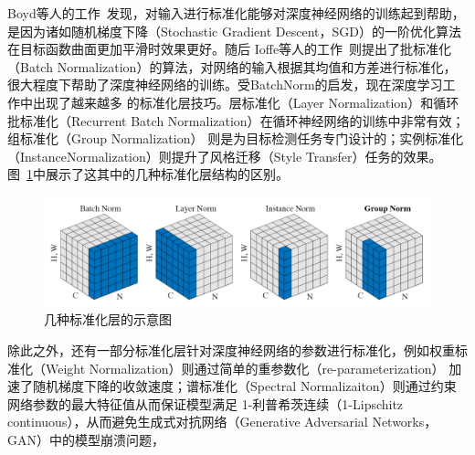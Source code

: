 Boyd等人的工作~\citep{boyd_convex_2004}发现，对输入进行标准化能够对深度神经网络的训练起到帮助，是因为诸如随机梯度下降（Stochastic Gradient Descent，SGD）的一阶优化算法在目标函数曲面更加平滑时效果更好。随后
Ioffe等人的工作~\citep{ioffe2015BN}则提出了批标准化（Batch Normalization）的算法，对网络的输入根据其均值和方差进行标准化，很大程度下帮助了深度神经网络的训练。受BatchNorm的启发，现在深度学习工作中出现了越来越多
的标准化层技巧。层标准化（Layer Normalization）\citep{lei2016LayerNorm}和循环批标准化（Recurrent Batch Normalization）\citep{cooijmans2016recurrent}在循环神经网络的训练中非常有效；组标准化（Group Normalization）
\citep{wu2018GroupNorm}则是为目标检测任务专门设计的；实例标准化（InstanceNormalization）\citep{ulyanov_instance_2016}则提升了风格迁移（Style Transfer）任务的效果。
图~\ref{fig:norm}中展示了这其中的几种标准化层结构的区别。
\begin{figure}
    \centering
    \includegraphics[width=\linewidth]{figures/norm.png}
    \caption{几种标准化层的示意图~\citep{wu2018GroupNorm}}
    \label{fig:norm}
\end{figure}

除此之外，还有一部分标准化层针对深度神经网络的参数进行标准化，例如权重标准化（Weight Normalization）\citep{Salimans2016Weight}则通过简单的重参数化（re-parameterization）
加速了随机梯度下降的收敛速度；谱标准化（Spectral Normalizaiton）\citep{miyato_spectral_2018}则通过约束网络参数的最大特征值从而保证模型满足
1-利普希茨连续（1-Lipschitz continuous），从而避免生成式对抗网络（Generative Adversarial Networks，GAN）中的模型崩溃问题，

